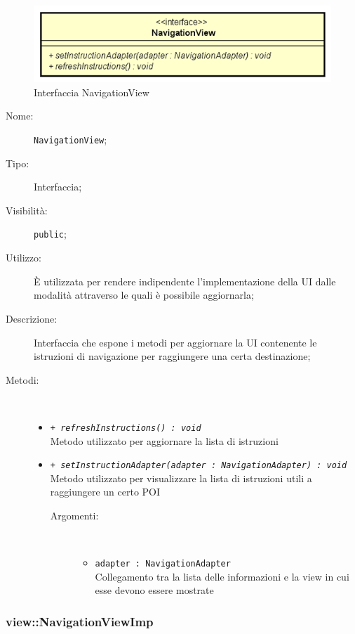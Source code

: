 \documentclass[../DefinizioneDiProdotto.tex]{subfiles}
\begin{document}
    \begin{figure}[H]
        \centering
        \includegraphics{img/NavigationView.png}
        \caption{Interfaccia NavigationView}\label{fig:view::NavigationView} 
    \end{figure}
    \begin{description}
\item[Nome:] \texttt{NavigationView};
\item[Tipo:] Interfaccia;
\item[Visibilità:] \texttt{public};
\item[Utilizzo:] È utilizzata per rendere indipendente l'implementazione della UI dalle modalità attraverso le quali è possibile aggiornarla;
\item[Descrizione:] Interfaccia che espone i metodi per aggiornare la UI contenente le istruzioni di navigazione per raggiungere una certa destinazione;
\item[Metodi:] \
\begin{itemize}
\item \texttt{+ \textit{refreshInstructions() : void}}\\
Metodo utilizzato per aggiornare la lista di istruzioni 
 \item \texttt{+ \textit{setInstructionAdapter(adapter : NavigationAdapter) : void}}\\
Metodo utilizzato per visualizzare la lista di istruzioni utili a raggiungere un certo POI
 \begin{description}
\item[Argomenti:] \
\begin{itemize}
\item \texttt{adapter : NavigationAdapter}\\
Collegamento tra la lista delle informazioni e la view in cui esse devono essere mostrate\end{itemize}
\end{description}
\end{itemize}
\end{description}

\subsubsection{view::NavigationViewImp}
\end{document}
